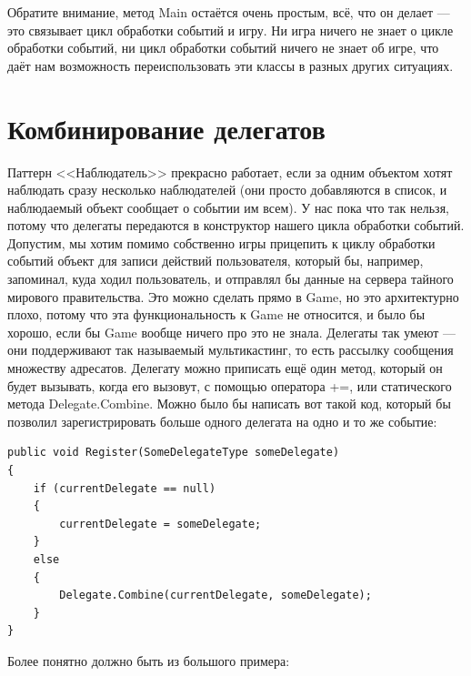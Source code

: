 \documentclass{../../text-style}
\begin{document}
Обратите внимание, метод Main остаётся очень простым, всё, что он делает --- это связывает цикл обработки событий и игру. Ни игра ничего не знает о цикле обработки событий, ни цикл обработки событий ничего не знает об игре, что даёт нам возможность переиспользовать эти классы в разных других ситуациях.

\section{Комбинирование делегатов}

Паттерн <<Наблюдатель>> прекрасно работает, если за одним объектом хотят наблюдать сразу несколько наблюдателей (они просто добавляются в список, и наблюдаемый объект сообщает о событии им всем). У нас пока что так нельзя, потому что делегаты передаются в конструктор нашего цикла обработки событий. Допустим, мы хотим помимо собственно игры прицепить к циклу обработки событий объект для записи действий пользователя, который бы, например, запоминал, куда ходил пользователь, и отправлял бы данные на сервера тайного мирового правительства. Это можно сделать прямо в Game, но это архитектурно плохо, потому что эта функциональность к Game не относится, и было бы хорошо, если бы Game вообще ничего про это не знала. Делегаты так умеют --- они поддерживают так называемый мультикастинг, то есть рассылку сообщения множеству адресатов. Делегату можно приписать ещё один метод, который он будет вызывать, когда его вызовут, с помощью оператора +=, или статического метода Delegate.Combine. Можно было бы написать вот такой код, который бы позволил зарегистрировать больше одного делегата на одно и то же событие:

\begin{verbatim}
public void Register(SomeDelegateType someDelegate)
{
    if (currentDelegate == null) 
    {
        currentDelegate = someDelegate;
    }
    else
    {
        Delegate.Combine(currentDelegate, someDelegate);
    }
}
\end{verbatim}

Более понятно должно быть из большого примера:
\end{document}
